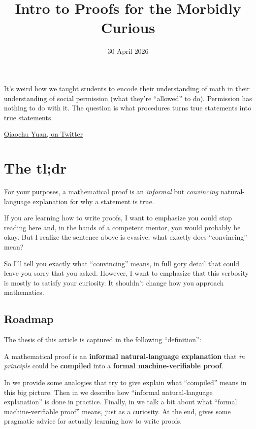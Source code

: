 \documentclass[11pt]{scrartcl}
\begin{document}
\title{Intro to Proofs for the Morbidly Curious}
\date{30 April 2026}
\maketitle
\epigraph{It's weird how we taught students to encode
  their understanding of math in their understanding of social permission
  (what they're ``allowed'' to do).
  Permission has nothing to do with it.
  The question is what procedures turns true statements into true statements.}
  {\href{https://twitter.com/QiaochuYuan/status/1306035720109404162}{Qiaochu Yuan, on Twitter}}

\tableofcontents

\section{The tl;dr}
\label{sec:tldr}

For your purposes, a \alert{mathematical proof} is an
\emph{informal} but \emph{convincing} natural-language explanation
for why a statement is true.

If you are learning how to write proofs,
I want to emphasize \alert{you could stop reading here} and,
in the hands of a competent mentor, you would probably be okay.
But I realize the sentence above is evasive:
what exactly does ``convincing'' mean?

So I'll tell you exactly what ``convincing'' means,
in full gory detail that could leave you sorry that you asked.
However, I want to emphasize that
\alert{this verbosity is mostly to satisfy your curiosity}.
It shouldn't change how you approach mathematics.

\subsection{Roadmap}
The thesis of this article is captured in the following ``definition'':
\begin{definition}
  A \alert{mathematical proof} is an
  \textbf{informal natural-language explanation}
  that \emph{in principle} could be \textbf{compiled} into a
  \textbf{formal machine-verifiable proof}.
\end{definition}
In  we provide some analogies that try to give
explain what ``compiled'' means in this big picture.
Then in  we describe how
``informal natural-language explanation'' is done in practice.
Finally, in  we talk a bit about
what ``formal machine-verifiable proof'' means, just as a curiosity.
At the end,  gives some pragmatic
advice for actually learning how to write proofs.
\end{document}
